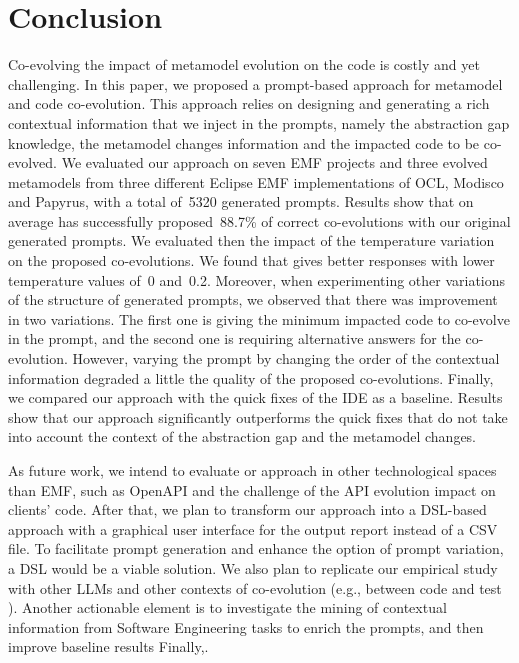 \section{Conclusion}
\label{conclu}
Co-evolving the impact of metamodel evolution on the code is costly and yet challenging. In this paper, we proposed a prompt-based approach for metamodel and code co-evolution. This approach relies on designing and generating a rich contextual information that we inject in the prompts, namely the abstraction gap knowledge, the metamodel changes information and  the impacted code to be co-evolved.
We evaluated our approach on seven EMF projects and three evolved metamodels from three different Eclipse EMF implementations of OCL, Modisco and Papyrus, with a total of~5320 generated prompts. Results show that on average \LLM has successfully proposed~88.7\% of correct co-evolutions with our original generated prompts. We evaluated then the impact of the temperature variation on the proposed co-evolutions. We found that \LLM gives better responses with lower temperature values of~0 and~0.2. 
Moreover, when experimenting other variations of the structure of generated prompts, we observed that there was improvement in two variations. 
The first one is giving the minimum impacted code to co-evolve in the prompt, and the second one is requiring alternative answers for the co-evolution. However, varying the prompt by changing the order of the contextual information degraded a little the quality of the proposed co-evolutions. 
Finally, we compared our approach with the quick fixes of the IDE as a baseline. Results show that our approach significantly outperforms the quick fixes that do not take into account the context of the abstraction gap and the metamodel changes.

As future work, we intend to evaluate or approach in other technological spaces than EMF, such as OpenAPI and the challenge of the API evolution impact on clients' code. After that, we plan to transform our approach into a DSL-based approach with a graphical user interface for the output report instead of a CSV file. To facilitate prompt generation and enhance the option of prompt variation, a DSL would be a viable solution. We also plan to replicate our empirical study with other LLMs and other contexts of co-evolution (e.g., between code and test \cite{le2021untangling}).  Another actionable element is to investigate the mining of contextual information from Software Engineering tasks to enrich the prompts, and then improve baseline results
Finally,. 


